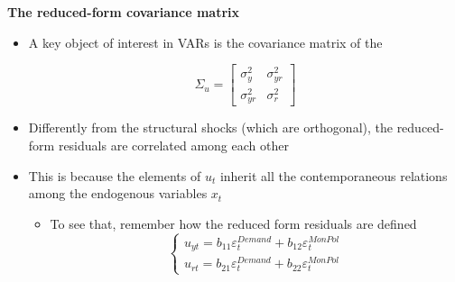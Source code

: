 \begin{frame}
{\textbf{The reduced-form covariance matrix}}

\begin{itemize}
\item A key object of interest in VARs is the covariance matrix of the {%
} 
\begin{equation*}
\Sigma _{u}=\left[ 
\begin{array}{cc}
\sigma _{y}^{2} & \sigma _{yr}^{2} \\ 
\sigma _{yr}^{2} & \sigma _{r}^{2}%
\end{array}%
\right]
\end{equation*}
\vspace{-.1cm}

\item Differently from the structural shocks (which are orthogonal), the
reduced-form residuals are correlated among each other\bigskip\pause

\item This is because the elements of $u_{t}$ inherit all the
contemporaneous relations among the endogenous variables $x_{t}$\smallskip

\begin{itemize}
\item To see that, remember how the reduced form residuals are defined%
\begin{equation*}
\left\{ 
\begin{array}{c}
u_{yt}=b_{11}\varepsilon _{t}^{Demand}+b_{12}\varepsilon _{t}^{MonPol} \\ 
u_{rt}=b_{21}\varepsilon _{t}^{Demand}+b_{22}\varepsilon _{t}^{MonPol}%
\end{array}%
\right.
\end{equation*}
\end{itemize}
\end{itemize}
\end{frame}



